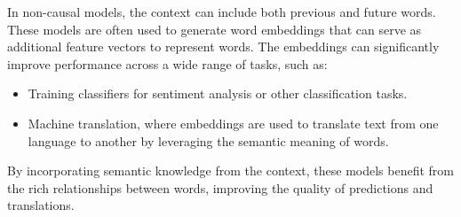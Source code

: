 In non-causal models, the context can include both previous and future words. 
These models are often used to generate word embeddings that can serve as additional feature vectors to represent words.
The embeddings can significantly improve performance across a wide range of tasks, such as:
\begin{itemize}
    \item Training classifiers for sentiment analysis or other classification tasks.
    \item Machine translation, where embeddings are used to translate text from one language to another by leveraging the semantic meaning of words.
\end{itemize}
\noindent By incorporating semantic knowledge from the context, these models benefit from the rich relationships between words, improving the quality of predictions and translations.